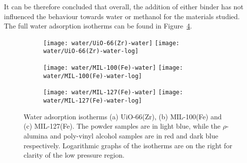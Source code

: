 It can be therefore concluded that overall, the addition of either 
binder has not influenced the behaviour towards water or 
methanol for the materials studied. The full water adsorption isotherms
can be found in Figure~\ref{fgr:shaping:wateradsorption}.

\begin{figure}[p!]
    \centering

    \begin{subfigure}{\linewidth}
        \centering
        \parbox{0.1\linewidth}{\caption{}\label{fgr:shaping:wateruio66}}%
        \texttt{[image: water/UiO-66(Zr)-water]}%
        \texttt{[image: water/UiO-66(Zr)-water-log]}%
    \end{subfigure}

    \begin{subfigure}{\linewidth}
        \centering
        \parbox{0.1\linewidth}{\caption{}\label{fgr:shaping:watermil100}}%
        \texttt{[image: water/MIL-100(Fe)-water]}%
        \texttt{[image: water/MIL-100(Fe)-water-log]}%
    \end{subfigure}

    \begin{subfigure}{\linewidth}
        \centering
        \parbox{0.1\linewidth}{\caption{}\label{fgr:shaping:watermil127}}%
        \texttt{[image: water/MIL-127(Fe)-water]}%
        \texttt{[image: water/MIL-127(Fe)-water-log]}%
    \end{subfigure}
    
    \caption{Water adsorption isotherms (a) UiO-66(Zr), 
    (b) MIL-100(Fe) and (c) MIL-127(Fe). The powder samples are in light
    blue, while the \(\rho\)-alumina and poly-vinyl alcohol samples are in red
    and dark blue respectively. Logarithmic graphs of the isotherms are
    on the right for clarity of the low
    pressure region.}%
    \label{fgr:shaping:wateradsorption}
\end{figure}



